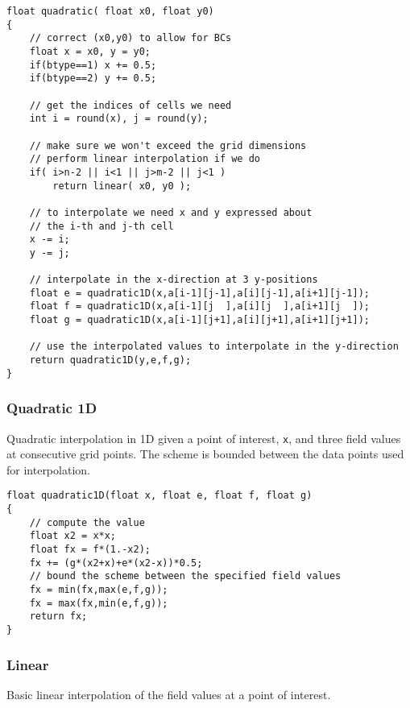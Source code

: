 \documentclass[notitlepage]{article}
\begin{document}
\begin{lstlisting}[style=myCpp]
float quadratic( float x0, float y0)
{
	// correct (x0,y0) to allow for BCs
	float x = x0, y = y0;
	if(btype==1) x += 0.5;
	if(btype==2) y += 0.5;
	
	// get the indices of cells we need
	int i = round(x), j = round(y);
	
	// make sure we won't exceed the grid dimensions
	// perform linear interpolation if we do
	if( i>n-2 || i<1 || j>m-2 || j<1 )
		return linear( x0, y0 );
	
	// to interpolate we need x and y expressed about
	// the i-th and j-th cell
	x -= i;
	y -= j;
	
	// interpolate in the x-direction at 3 y-positions
	float e = quadratic1D(x,a[i-1][j-1],a[i][j-1],a[i+1][j-1]);
	float f = quadratic1D(x,a[i-1][j  ],a[i][j  ],a[i+1][j  ]);
	float g = quadratic1D(x,a[i-1][j+1],a[i][j+1],a[i+1][j+1]);
	
	// use the interpolated values to interpolate in the y-direction
	return quadratic1D(y,e,f,g);
}
\end{lstlisting}

\subsubsection{Quadratic 1D}

Quadratic interpolation in 1D given a point of interest, \texttt{x}, and three field
values at consecutive grid points. The scheme is bounded between the data points
used for interpolation.

\begin{lstlisting}[style=myCpp]
float quadratic1D(float x, float e, float f, float g)
{
	// compute the value
	float x2 = x*x;
	float fx = f*(1.-x2);
	fx += (g*(x2+x)+e*(x2-x))*0.5;
	// bound the scheme between the specified field values
	fx = min(fx,max(e,f,g));
	fx = max(fx,min(e,f,g));
	return fx;
} 
\end{lstlisting}

\subsubsection{Linear}

Basic linear interpolation of the field values at a point of interest.
\end{document}
